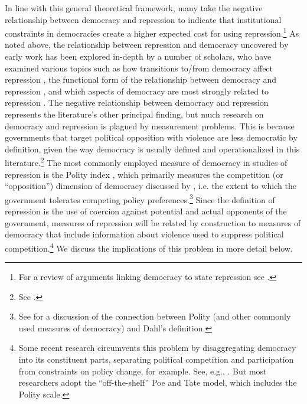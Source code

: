 \documentclass[11pt]{article}
\begin{document}
In line with this general theoretical framework, many take the negative relationship between democracy and repression to indicate that institutional constraints in democracies create a higher expected cost for using repression.\footnote{For a review of arguments linking democracy to state repression see \citet{Davenport2007}.} As noted above, the relationship between repression and democracy uncovered by early work \citep{Henderson1991,PoeTate1994} has been explored in-depth by a number of scholars, who have examined various topics such as how transitions to/from democracy affect repression \citep{Davenport1999}, the functional form of the relationship between democracy and repression \citep{Fein1995,DavenportArmstrong2004}, and which aspects of democracy are most strongly related to repression \citep{BDMetal2005, Davenport2007, ConradMoore2010}. The negative relationship between democracy and repression represents the literature's other principal finding, but much research on democracy and repression is plagued by measurement problems. This is because governments that target political opposition with violence are less democratic by definition, given the way democracy is usually defined and operationalized in this literature.\footnote{See \citet{Hill2013}.} The most commonly employed measure of democracy in studies of repression is the Polity index \citep{MarshallJaggers2009}, which primarily measures the competition (or ``opposition'') dimension of democracy discussed by \citet{Dahl1971}, i.e. the extent to which the government tolerates competing policy preferences.\footnote{See \citet{MunckVerkuilen2002} for a discussion of the connection between Polity (and other commonly used measures of democracy) and Dahl's definition.} Since the definition of repression is the use of coercion against potential and actual opponents of the government, measures of repression will be related by construction to measures of democracy that include information about violence used to suppress political competition.\footnote{Some recent research circumvents this problem by disaggregating democracy into its constituent parts, separating political competition and participation from constraints on policy change, for example. See, e.g., \citet{Davenport2007,DavenportMooreArmstrong2007,ConradMoore2010}. But most researchers adopt the ``off-the-shelf'' Poe and Tate model, which includes the Polity scale.} We discuss the implications of this problem in more detail below. 
\end{document}
